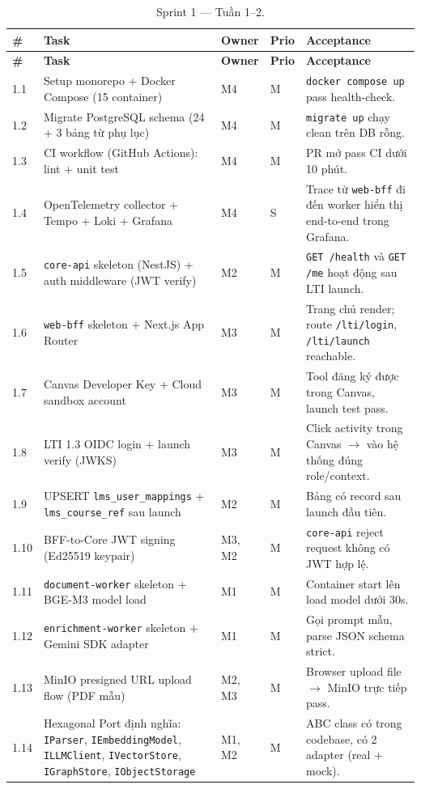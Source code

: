 \begin{longtable}{|p{0.7cm}|p{6.3cm}|p{1.2cm}|p{1cm}|p{3cm}|}
    \caption{Sprint 1 --- Tuần 1--2.}
    \label{tab:sprint1-gd2} \\
    \hline
    \textbf{\#} & \textbf{Task} & \textbf{Owner} & \textbf{Prio} & \textbf{Acceptance} \\
    \hline
    \endfirsthead
    \hline
    \textbf{\#} & \textbf{Task} & \textbf{Owner} & \textbf{Prio} & \textbf{Acceptance} \\
    \hline
    \endhead

    1.1 & Setup monorepo + Docker Compose (15 container) & M4 & M & \texttt{docker compose up} pass health-check. \\ \hline
    1.2 & Migrate PostgreSQL schema (24 + 3 bảng từ phụ lục) & M4 & M & \texttt{migrate up} chạy clean trên DB rỗng. \\ \hline
    1.3 & CI workflow (GitHub Actions): lint + unit test & M4 & M & PR mở pass CI dưới 10 phút. \\ \hline
    1.4 & OpenTelemetry collector + Tempo + Loki + Grafana & M4 & S & Trace từ \texttt{web-bff} đi đến worker hiển thị end-to-end trong Grafana. \\ \hline
    1.5 & \texttt{core-api} skeleton (NestJS) + auth middleware (JWT verify) & M2 & M & \texttt{GET /health} và \texttt{GET /me} hoạt động sau LTI launch. \\ \hline
    1.6 & \texttt{web-bff} skeleton + Next.js App Router & M3 & M & Trang chủ render; route \texttt{/lti/login}, \texttt{/lti/launch} reachable. \\ \hline
    1.7 & Canvas Developer Key + Cloud sandbox account & M3 & M & Tool đăng ký được trong Canvas, launch test pass. \\ \hline
    1.8 & LTI 1.3 OIDC login + launch verify (JWKS) & M3 & M & Click activity trong Canvas $\to$ vào hệ thống đúng role/context. \\ \hline
    1.9 & UPSERT \texttt{lms\_user\_mappings} + \texttt{lms\_course\_ref} sau launch & M2 & M & Bảng có record sau launch đầu tiên. \\ \hline
    1.10 & BFF-to-Core JWT signing (Ed25519 keypair) & M3, M2 & M & \texttt{core-api} reject request không có JWT hợp lệ. \\ \hline
    1.11 & \texttt{document-worker} skeleton + BGE-M3 model load & M1 & M & Container start lên load model dưới 30s. \\ \hline
    1.12 & \texttt{enrichment-worker} skeleton + Gemini SDK adapter & M1 & M & Gọi prompt mẫu, parse JSON schema strict. \\ \hline
    1.13 & MinIO presigned URL upload flow (PDF mẫu) & M2, M3 & M & Browser upload file $\to$ MinIO trực tiếp pass. \\ \hline
    1.14 & Hexagonal Port định nghĩa: \texttt{IParser}, \texttt{IEmbeddingModel}, \texttt{ILLMClient}, \texttt{IVectorStore}, \texttt{IGraphStore}, \texttt{IObjectStorage} & M1, M2 & M & ABC class có trong codebase, có 2 adapter (real + mock). \\ \hline
\end{longtable}

